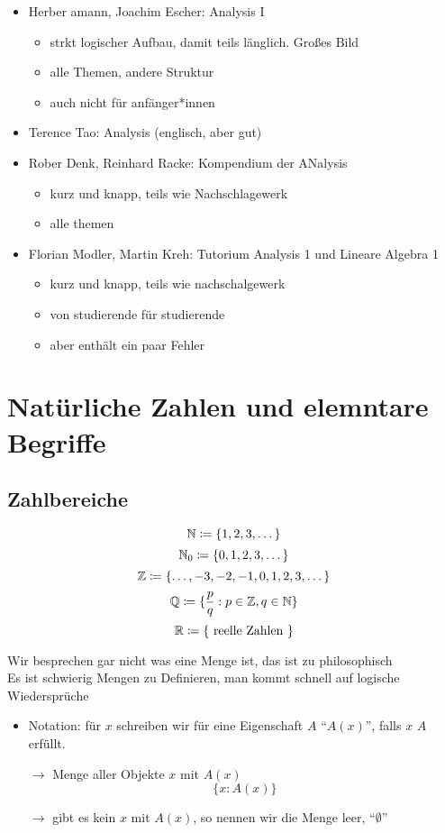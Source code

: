 \documentclass[consecutivenumbering]{gadsescript}
\begin{document}
\begin{itemize}
\begin{itemize}
		\end{itemize}
	\item Herber amann, Joachim Escher: Analysis I
		\begin{itemize}
			\item strkt logischer Aufbau, damit teils länglich. Großes Bild
			\item alle Themen, andere Struktur
			\item auch nicht für anfänger*innen
		\end{itemize}
	\item Terence Tao: Analysis (englisch, aber gut)
	\item Rober Denk, Reinhard Racke: Kompendium der ANalysis
		\begin{itemize}
			\item kurz und knapp, teils wie Nachschlagewerk
			\item alle themen
		\end{itemize}
	\item Florian Modler, Martin Kreh: Tutorium Analysis 1 und Lineare Algebra 1
		\begin{itemize}
			\item kurz und knapp, teils wie nachschalgewerk
			\item von studierende für studierende
			\item aber enthält ein paar Fehler
		\end{itemize}
\end{itemize}

\newpage
\section{Natürliche Zahlen und elemntare Begriffe}
\subsection{Zahlbereiche}
\[ \mathbb{N} \coloneqq \{ 1, 2, 3, \dotsc \} \]
\[ \mathbb{N}_0 \coloneqq \{ 0, 1, 2, 3, \dotsc \} \]
\[ \mathbb{Z} \coloneqq \{ \dotsc, -3, -2, -1, 0, 1, 2, 3, \dotsc \} \]
\[ \mathbb{Q} \coloneqq \{ \frac{p}{q} : p \in \mathbb{Z}, q \in \mathbb{N} \} \]
\[ \mathbb{R} \coloneqq \{ \text{ reelle Zahlen } \} \]

Wir besprechen gar nicht was eine Menge ist, das ist zu philosophisch\\
Es ist schwierig Mengen zu Definieren, man kommt schnell auf logische Wiedersprüche\\

\begin{itemize}
	\item Notation: für $ x $ schreiben wir für eine Eigenschaft $ A $ ``$ A(x)$'', falls $ x $ $ A $ erfüllt.
	\item[$\rightarrow$] Menge aller Objekte $ x $ mit $ A(x) $
		\[ \{ x : A(x) \} \]
	\item[$\rightarrow$] gibt es kein $ x$ mit $ A(x) $, so nennen wir die Menge leer, ``$\emptyset$''
\end{itemize}
\end{document}
